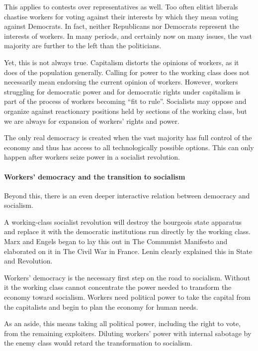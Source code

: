 This applies to contests over representatives as well. Too often elitist liberals chastise workers for voting against their interests by which they mean voting against Democrats. In fact, neither Republicans nor Democrats represent the interests of workers. In many periods, and certainly now on many issues, the vast majority are further to the left than the politicians.

Yet, this is not always true. Capitalism distorts the opinions of workers, as it does of the population generally. Calling for power to the working class does not necessarily mean endorsing the current opinion of workers. However, workers struggling for democratic power and for democratic rights under capitalism is part of the process of workers becoming “fit to rule”. Socialists may oppose and organize against reactionary positions held by sections of the working class, but we are always for expansion of workers’ rights and power.

The only real democracy is created when the vast majority has full control of the economy and thus has access to all technologically possible options. This can only happen after workers seize power in a socialist revolution.

\paragraph{Workers’ democracy and the transition to socialism}

Beyond this, there is an even deeper interactive relation between democracy and socialism.

A working-class socialist revolution will destroy the bourgeois state apparatus and replace it with the democratic institutions run directly by the working class. Marx and Engels began to lay this out in The Communist Manifesto and elaborated on it in The Civil War in France. Lenin clearly explained this in State and Revolution.

Workers’ democracy is the necessary first step on the road to socialism. Without it the working class cannot concentrate the power needed to transform the economy toward socialism. Workers need political power to take the capital from the capitalists and begin to plan the economy for human needs.

As an aside, this means taking all political power, including the right to vote, from the remaining exploiters. Diluting workers’ power with internal sabotage by the enemy class would retard the transformation to socialism.

